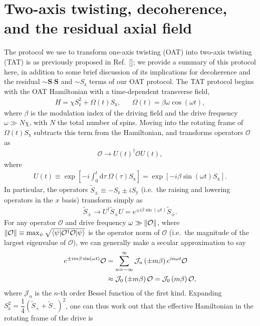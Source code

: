 \documentclass[aps,prx,superscriptaddress,notitlepage,twocolumn,longbibliography]{revtex4-1}
\newcommand{\f}[2]{\dfrac{#1}{#2}} %
\newcommand{\p}[1]{\left(#1\right)} %
\renewcommand{\sp}[1]{\left[#1\right]} %
\renewcommand{\c}{\cdot} %
\renewcommand{\d}{\text{d}} %
\renewcommand{\v}{\bm} %
\newcommand{\J}{\mathcal{J}}
\renewcommand{\O}{\mathcal{O}}
\newcommand{\z}{\text{z}}
\newcommand{\x}{\text{x}}
\newcommand{\y}{\text{y}}
\begin{document}
\section{Two-axis twisting, decoherence, and the residual axial field}
\label{sec:derivation_TAT}

The protocol we use to transform one-axis twisting (OAT) into two-axis twisting (TAT) is as previously proposed in Ref.~[]; we provide a summary of this protocol here, in addition to some brief discussion of its implications for decoherence and the residual $\sim\v S\v\c\v S$ and $\sim S_\z$ terms of our OAT protocol.
The TAT protocol begins with the OAT Hamiltonian with a time-dependent transverse field,
\begin{align}
  H = \chi S_\z^2 + \Omega\p{t} S_\x,
  &&
  \Omega\p{t} = \beta\omega \cos\p{\omega t},
  \label{eq:driven_OAT}
\end{align}
where $\beta$ is the modulation index of the driving field and the drive frequency $\omega\gg N\chi$, with $N$ the total number of spins.
Moving into the rotating frame of $\Omega\p{t}S_\x$ subtracts this term from the Hamiltonian, and transforms operators $\O$ as
\begin{align}
  \O \to U\p{t}^\dag \O U\p{t},
\end{align}
where
\begin{align}
  U\p{t} \equiv \exp\sp{-i\int_0^t\d\tau~\Omega\p{\tau}S_\x}
  = \exp\sp{-i\beta\sin\p{\omega t}S_\x}.
\end{align}
In particular, the operators $\tilde S_\pm\equiv-S_\z\pm iS_\y$ (i.e.~the raising and lowering operators in the $x$ basis) transform simply as
\begin{align}
  \tilde S_\pm
  \to U^\dag \tilde S_\pm U
  = e^{\pm i\beta\sin\p{\omega t}} \tilde S_\pm.
\end{align}
For any operator $\O$ and drive frequency $\omega\gg\norm{\O}$, where $\norm{\O}\equiv\max_\psi\sqrt{\braket{\psi|\O^\dag\O|\psi}}$ is the operator norm of $\O$ (i.e.~the magnitude of the largest eigenvalue of $\O$), we can generally make a secular approximation to say
\begin{align}
  e^{\pm im\beta\sin\p{\omega t}} \O
  &= \sum_{n=-\infty}^\infty \J_n\p{\pm m\beta} e^{in\omega t} \O \notag \\
  &\approx \J_0\p{\pm m\beta} \O
  = \J_0\p{m\beta} \O,
\end{align}
where $\J_n$ is the $n$-th order Bessel function of the first kind.
Expanding $S_\z^2=\f14\p{\tilde S_+ + \tilde S_-}^2$, one can thus work out that the effective Hamiltonian in the rotating frame of the drive is
\end{document}
